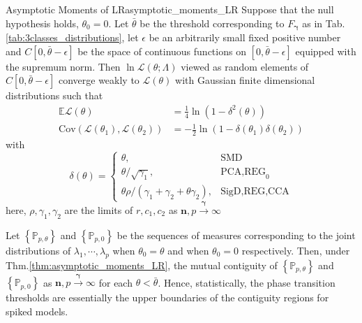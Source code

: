 \documentclass[twoside]{article}
\begin{document}
\begin{theorem}{Asymptotic Moments of LR}{asymptotic_moments_LR}
    Suppose that the null hypothesis holds, $\theta_0= 0$. Let $\bar{\theta}$ be the threshold corresponding to $F_{\boldsymbol{\gamma}}$ as in Tab.\ref{tab:3classes_distributions}, let $\epsilon$ be an arbitrarily small fixed positive number and $C[0,\bar{\theta}-\epsilon]$ be the space of continuous functions on $[0,\bar{\theta}-\epsilon]$ equipped with the supremum norm. Then 
    $\ln \mathcal{L}(\theta;\Lambda)$ viewed as random elements of $C[0,\bar{\theta}-\epsilon]$ converge weakly to $\mathcal{L}(\theta)$ with Gaussian finite dimensional distributions such that 
    \begin{align*}
        \mathbb{E}\mathcal{L}(\theta) &= \frac{1}{4}\ln(1-\delta^2(\theta)) \\
        \mathrm{Cov}\left(\mathcal{L}(\theta_1),\mathcal{L}(\theta_2)\right)&= -\frac{1}{2}\ln \left(1-\delta(\theta_1)\delta(\theta_2)\right)
    \end{align*}
    with 
    $$
    \delta(\theta) = \begin{cases}
        \theta, & \text{SMD}\\
        \theta/\sqrt{\gamma_1}, & \text{PCA,REG}_0\\
        \theta\rho/(\gamma_1+\gamma_2+\theta\gamma_2), & \text{SigD,REG,CCA}
    \end{cases}
    $$
    here, $\rho,\gamma_1,\gamma_2$ are the limits of $r,c_1,c_2$ as $\mathbf{n},p\xrightarrow{\boldsymbol{\gamma}}\infty$
\end{theorem}
Let $\left\{\mathbb{P}_{p,\theta}\right\}$ and $\left\{\mathbb{P}_{p,0}\right\}$ be the sequences of measures corresponding to the joint distributions of $\lambda_1,\cdots,\lambda_p$ when $\theta_0=\theta$ and when $\theta_0= 0$ respectively. Then, under Thm.\ref{thm:asymptotic_moments_LR}, the mutual contiguity of $\left\{\mathbb{P}_{p,\theta}\right\}$ and $\left\{\mathbb{P}_{p,0}\right\}$ as $\mathbf{n},p\xrightarrow{\boldsymbol{\gamma}}\infty$ for each $\theta<\bar{\theta}$.
Hence, statistically, the phase transition thresholds are essentially the upper boundaries of the contiguity regions for spiked models.
\end{document}
